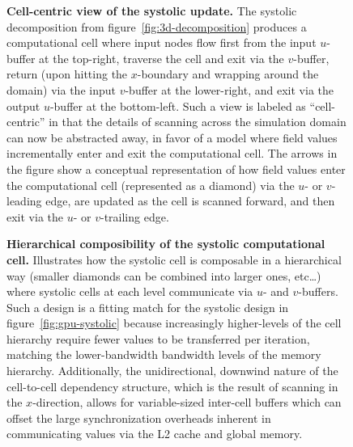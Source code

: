 \documentclass[12pt]{article}
\newcommand{\myfig}[3]{
  \begin{figure}[bp]
		\begin{center}
			
      \caption{\textbf{#2}#3\label{fig:#1}}
		\end{center}
	\end{figure}
}
\begin{document}
\myfig{3d-systolic}{
  Cell-centric view of the systolic update.}{
  The systolic decomposition from figure~\ref{fig:3d-decomposition}
    produces a computational cell
    where input nodes flow first from the input $u$-buffer at the top-right,
    traverse the cell and exit via the $v$-buffer,
    return (upon hitting the $x$-boundary and wrapping around the domain)
    via the input $v$-buffer at the lower-right,
    and exit via the output $u$-buffer at the bottom-left.
  Such a view is labeled as ``cell-centric''
    in that the details of scanning across the simulation domain
    can now be abstracted away,
    in favor of a model where field values incrementally enter and exit
    the computational cell.
  The arrows in the figure show a conceptual representation
    of how field values enter the computational cell
    (represented as a diamond) via the $u$- or $v$-leading edge,
    are updated as the cell is scanned forward,
    and then exit via the $u$- or $v$-trailing edge.
}

\myfig{3d-composite}{
  Hierarchical composibility of the systolic computational cell.}{
  Illustrates how the systolic cell is composable in a hierarchical way
    (smaller diamonds can be combined into larger ones, etc\ldots)
    where systolic cells at each level communicate via $u$- and $v$-buffers.
  Such a design is a fitting match for the systolic design
    in figure~\ref{fig:gpu-systolic}
    because increasingly higher-levels of the cell hierarchy
    require fewer values to be transferred per iteration,
    matching the lower-bandwidth bandwidth levels
    of the memory hierarchy.
  Additionally, the unidirectional, downwind nature
    of the cell-to-cell dependency structure,
    which is the result of scanning in the $x$-direction,
    allows for variable-sized inter-cell buffers
    which can offset the large synchronization overheads
    inherent in communicating values via the L2 cache and global memory.
}
\end{document}
